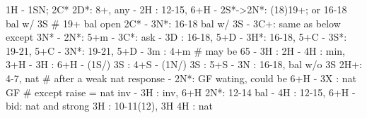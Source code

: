 1H - 1SN; 2C*
2D*: 8+, any
   - 2H : 12-15, 6+H
   - 2S*->2N*: (18)19+; or 16-18 bal w/ 3S  # 19+ bal open 2C*
             - 3N*: 16-18 bal w/ 3S
             - 3C+: same as below except 3N*
   - 2N*: 5+m
        - 3C*: ask
            - 3D : 16-18, 5+D
            - 3H*: 16-18, 5+C
            - 3S*: 19-21, 5+C
            - 3N*: 19-21, 5+D
   - 3m : 4+m  # may be 65
        - 3H : 2H
        - 4H : min, 3+H
   - 3H : 6+H
   - (1S/) 3S : 4+S
   - (1N/) 3S : 5+S
   - 3N : 16-18, bal w/o 3S
2H+: 4-7, nat
# after a weak nat response
   - 2N*: GF wating, could be 6+H
   - 3X : nat GF  # except raise = nat inv
   - 3H : inv, 6+H
2N*: 12-14 bal
   - 4H : 12-15, 6+H
   - bid: nat and strong
3H : 10-11(12), 3H
4H : nat